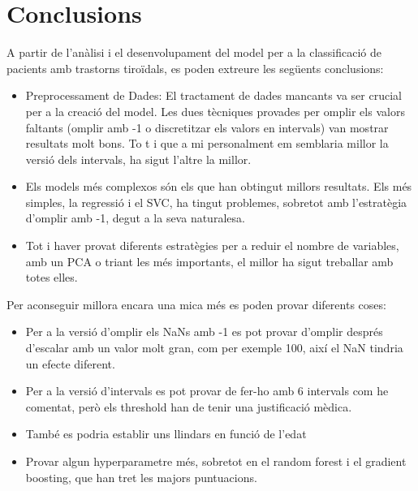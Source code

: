 \documentclass[9pt,a4paper,twoside]{tau-class/tau}
\begin{document}
    \section{Conclusions}
    A partir de l'anàlisi i el desenvolupament del model per a la classificació de pacients amb trastorns tiroïdals, es poden extreure les següents conclusions:
    \begin{itemize}
        \item Preprocessament de Dades: El tractament de dades mancants va ser crucial per a la creació del model. Les dues tècniques provades per omplir els valors faltants (omplir amb -1 o discretitzar els valors en intervals) van mostrar resultats molt bons. To t i que a mi personalment em semblaria millor la versió dels intervals, ha sigut l'altre la millor.
        \item Els models més complexos són els que han obtingut millors resultats. Els més simples, la regressió i el SVC, ha tingut problemes, sobretot amb l'estratègia d'omplir amb -1, degut a la seva naturalesa.
        \item Tot i haver provat diferents estratègies per a reduir el nombre de variables, amb un PCA o triant les més importants, el millor ha sigut treballar amb totes elles.
    \end{itemize}

    Per aconseguir millora encara una mica més es poden provar diferents coses:
    \begin{itemize}
        \item Per a la versió d'omplir els NaNs amb -1 es pot provar d'omplir després d'escalar amb un valor molt gran, com per exemple 100, així el NaN tindria un efecte diferent.
        \item Per a la versió d'intervals es pot provar de fer-ho amb 6 intervals com he comentat, però els threshold han de tenir una justificació mèdica.
        \item També es podria establir uns llindars en funció de l'edat
        \item Provar algun hyperparametre més, sobretot en el random forest i el gradient boosting, que han tret les majors puntuacions.
    \end{itemize}
\end{document}
